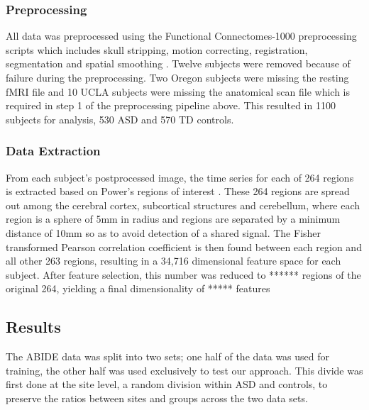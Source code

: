 \documentclass{llncs}
\begin{document}
\subsubsection{Preprocessing}
All data was preprocessed using the Functional Connectomes-1000 preprocessing scripts which includes skull stripping, motion correcting, registration, segmentation and spatial smoothing \cite{fcon}. 
Twelve subjects were removed because of failure during the preprocessing.  Two Oregon subjects were missing the resting fMRI file and 10 UCLA subjects were missing the anatomical scan file which is required in step 1 of the preprocessing pipeline above. This resulted in 1100 subjects for analysis, 530 ASD and 570 TD controls.
\subsubsection{Data Extraction}
From each subject's postprocessed image, the time series for each of 264 regions is extracted based on Power's regions of interest \cite{Powers}. These 264 regions are spread out among the cerebral cortex, subcortical structures and cerebellum, where each region is a sphere of 5mm in radius and regions are separated by a minimum distance of 10mm so as to avoid detection of a shared signal. The Fisher transformed Pearson correlation coefficient is then found between each region and all other 263 regions, resulting in a 34,716 dimensional feature space for each subject. After feature selection, this number was reduced to ****** regions of the original 264, yielding a final dimensionality of ***** features
\subsection{Results}
The ABIDE data was split into two sets; one half of the data was used for training, the other half was used exclusively to test our approach.  This divide was first done at the site level, a random division within ASD and controls, to preserve the ratios between sites and groups across the two data sets.
\end{document}
